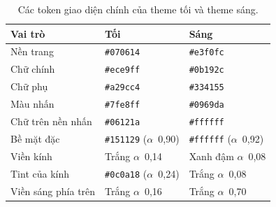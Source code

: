 \begin{table}[htbp]
    \centering
    \caption{Các token giao diện chính của theme tối và theme sáng.}
    \label{tab:token-sang-toi}
    \small
    \begin{tabularx}{\textwidth}{@{}>{\raggedright\arraybackslash}X>{\raggedright\arraybackslash}p{3.4cm}>{\raggedright\arraybackslash}p{3.4cm}@{}}
        \toprule
        \textbf{Vai trò} & \textbf{Tối} & \textbf{Sáng} \\
        \midrule
        Nền trang & \texttt{\#070614} & \texttt{\#e3f0fc} \\
        Chữ chính & \texttt{\#ece9ff} & \texttt{\#0b192c} \\
        Chữ phụ & \texttt{\#a29cc4} & \texttt{\#334155} \\
        Màu nhấn & \texttt{\#7fe8ff} & \texttt{\#0969da} \\
        Chữ trên nền nhấn & \texttt{\#06121a} & \texttt{\#ffffff} \\
        Bề mặt đặc & \texttt{\#151129} ($\alpha$~0,90) & \texttt{\#ffffff} ($\alpha$~0,92) \\
        Viền kính & Trắng $\alpha$~0,14 & Xanh đậm $\alpha$~0,08 \\
        Tint của kính & \texttt{\#0c0a18} ($\alpha$~0,24) & Trắng $\alpha$~0,08 \\
        Viền sáng phía trên & Trắng $\alpha$~0,16 & Trắng $\alpha$~0,70 \\
        \bottomrule
    \end{tabularx}
\end{table}


